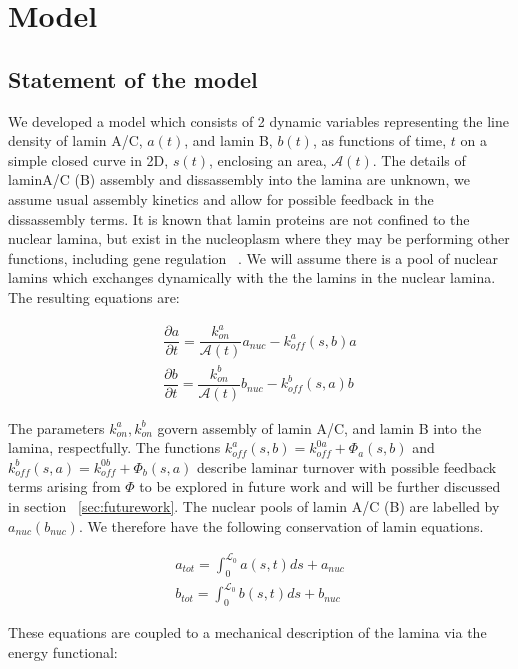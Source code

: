 \section{Model}

\subsection{Statement of the model} We developed a model which consists of 2 dynamic variables representing the line density of lamin A/C, $a(t)$, and lamin B, $b(t)$, as functions of time, $t$ on a simple closed curve in 2D, $s(t)$, enclosing an area, $\mathcal{A}(t)$. The details of laminA/C (B)  assembly and dissassembly into the lamina are unknown, we assume usual assembly kinetics and allow for possible feedback in the dissassembly terms. It is known that lamin proteins are not confined to the nuclear lamina, but exist in the nucleoplasm where they may be performing other functions, including gene regulation ~\cite{Hozak1995, Hutchison2002}. We will assume there is a pool of nuclear lamins which exchanges dynamically with the the lamins in the nuclear lamina. The resulting equations are:

\begin{align}
\dfrac{\partial a}{\partial t} = \dfrac{k_{on}^a}{\mathcal{A}(t)} a_{nuc} - k_{off}^a (s,b)a\\[7pt]
\dfrac{\partial b}{\partial t} = \dfrac{k_{on}^b}{\mathcal{A}(t)}b_{nuc} - k_{off}^b  (s,a)b \label{eq::laminaKinetics}
\end{align}

The parameters $k_{on}^a , k_{on}^b$  govern assembly of lamin A/C, and lamin B into the lamina, respectfully. The functions $k_{off}^a (s,b) = k_{off}^{0a} + \Phi_a(s,b)$ and $ k_{off}^b(s,a)  = k_{off}^{0b} + \Phi_b(s,a)$ describe laminar turnover with possible feedback terms arising from $\Phi$ to be explored in future work and will be further discussed in section ~\ref{sec:futurework}. The nuclear pools of lamin A/C (B) are labelled by $a_{nuc} (b_{nuc})$. We therefore have the following conservation of lamin equations. 

\begin{align}
a_{tot}= \int_0^{\mathcal{L}_0} a(s,t) ds + a_{nuc}\\
b_{tot} = \int_0^{\mathcal{L}_0} b(s,t) ds + b_{nuc}
\end{align}

These equations are coupled to a mechanical description of the lamina via the energy functional:

